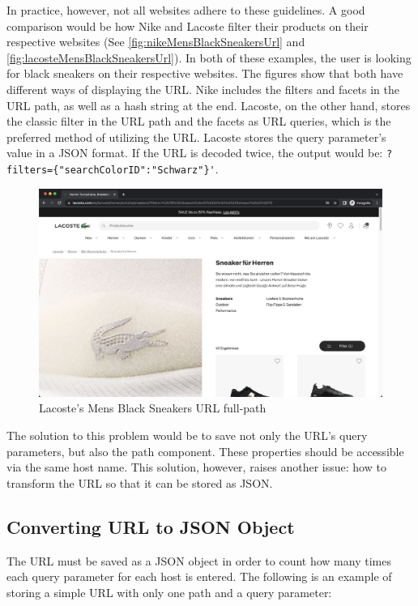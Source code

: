 In practice, however, not all websites adhere to these guidelines. A good comparison would be how Nike and Lacoste filter their products on their respective websites (See \autoref{fig:nikeMensBlackSneakersUrl} and \autoref{fig:lacosteMensBlackSneakersUrl}). In both of these examples, the user is looking for black sneakers on their respective websites. The figures show that both have different ways of displaying the URL. Nike includes the filters and facets in the URL path, as well as a hash string at the end. Lacoste, on the other hand, stores the classic filter in the URL path and the facets as URL queries, which is the preferred method of utilizing the URL. Lacoste stores the query parameter's value in a JSON format. If the URL is decoded twice, the output would be: \verb;?filters={"searchColorID":"Schwarz"}';.

\begin{figure}[H]
  \includegraphics[width=\textwidth]{assets/screenshot_lacoste_website.png}
  \caption{Lacoste's Mens Black Sneakers URL full-path}
  \label{fig:lacosteMensBlackSneakersUrl}
\end{figure}

The solution to this problem would be to save not only the URL's query parameters, but also the path component. These properties should be accessible via the same host name. This solution, however, raises another issue: how to transform the URL so that it can be stored as JSON.

\subsection*{Converting URL to JSON Object}
The URL must be saved as a JSON object in order to count how many times each query parameter for each host is entered. The following is an example of storing a simple URL with only one path and a query parameter:

